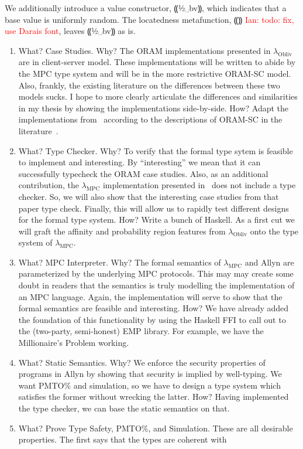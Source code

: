 \documentclass{report}
\newcommand{\lang}{Allyn\xspace}
\newcommand{\mpc}{\ensuremath{\lambda_{\mathrm{MPC}}}\xspace}
\newcommand{\obliv}{\ensuremath{\lambda_{\mathrm{Obliv}}}\xspace}
\newcommand{\ins}[1]{\textcolor{red}{Ian: #1}}
\begin{document}
We additionally introduce a value constructor, ⸨½␣bv⸩, which indicates that a base value is uniformly random. The locatedness metafunction,
⸨⸩ \ins{todo: fix, use Darais font}, leaves ⸨½␣bv⸩ as is.

\begin{enumerate}
\item What? Case Studies. Why? The ORAM implementations presented in \obliv are in client-server model. These implementations will
  be written to abide by the MPC type system and will be in the more restrictive ORAM-SC model. Also, frankly, the existing literature
  on the differences between these two models sucks. I hope to more clearly articulate the differences and similarities in my thesis
  by showing the implementations side-by-side. How? Adapt the implementations from~\citet{lam-obliv} according to the descriptions of
  ORAM-SC in the literature~\cite{}.
\item What? Type Checker. Why? To verify that the formal type sytem is feasible to implement and interesting. By ``interesting'' we mean
  that it can successfully typecheck the ORAM case studies. Also, as an additional contribution, the \mpc implementation presented
  in~\citet{symphony} does not include a type checker. So, we will also show that the interesting case studies from that paper type check.
  Finally, this will allow us to rapidly test different designs for the formal type system. How? Write a bunch of Haskell. As a first cut
  we will graft the affinity and probability region features from \obliv onto the type system of \mpc.
\item What? MPC Interpreter. Why? The formal semantics of \mpc and \lang are parameterized by the underlying MPC protocols. This may
  may create some doubt in readers that the semantics is truly modelling the implementation of an MPC language. Again, the implementation
  will serve to show that the formal semantics are feasible and interesting. How? We have already added the foundation of this functionality
  by using the Haskell FFI to call out to the (two-party, semi-honest) EMP library. For example, we have the Millionaire's Problem working.
\item What? Static Semantics. Why? We enforce the security properties of programs in \lang by showing that security is implied by
  well-typing. We want PMTO\% and simulation, so we have to design a type system which satisfies the former without wrecking the latter.
  How? Having implemented the type checker, we can base the static semantics on that.
\item What? Prove Type Safety, PMTO\%, and Simulation. These are all desirable properties. The first says that the types are coherent with

\end{enumerate}
\end{document}
